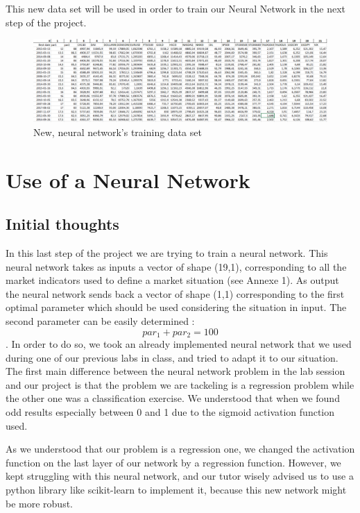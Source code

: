 \documentclass[]{article}
\begin{document}
\vskip 0.3cm
This new data set will be used in order to train our Neural Network in the next step of the project. 

\begin{figure}[hbt!]
	\center{}
	\includegraphics[scale=0.35]{image/training_set.png}
	\caption{New, neural network's training data set}
\end{figure}


\section{Use of a Neural Network}
\subsection{Initial thoughts}
\vskip 0.3cm
In this last step of the project we are trying to train a neural network. This neural network takes as inputs a vector of shape (19,1), corresponding to all the market indicators used to define a market situation (see Annexe 1). As output the neural network sends back a vector of shape (1,1) corresponding to the first optimal parameter which should be used considering the situation in input. The second parameter can be easily determined : \[par_{1} + par_{2} = 100\].
\vskip 0.3cm
In order to do so, we took an already implemented neural network that we used during one of our previous labs in class, and tried to adapt it to our situation. \\
The first main difference between the neural network problem in the lab session and our project is that the problem we are tackeling is a regression problem while the other one was a classification exercise. We understood that when we found odd results especially between 0 and 1 due to the sigmoid activation function used.

\vskip 0.3cm
As we understood that our problem is a regression one, we changed the activation function on the last layer of our network by a regression function. However, we kept struggling  with this neural network, and our tutor wisely advised us to use a python library like scikit-learn to implement it, because this new network might be more robust.
\end{document}
